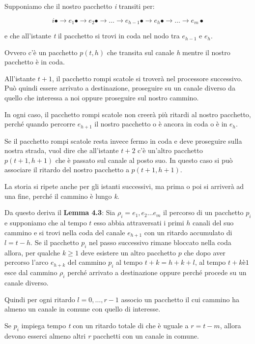 Supponiamo che il nostro pacchetto \emph{i} transiti per:

$$
i \bullet \rightarrow e_1 \bullet\rightarrow e_2\bullet \rightarrow \ldots \rightarrow e_{h-1} \bullet \rightarrow e_h \bullet \rightarrow \ldots \rightarrow e_{m}\bullet
$$

e che all'istante \emph{t} il pacchetto si trovi in coda nel nodo tra $e_{h-1}$ e $e_h$.

Ovvero c'è un pacchetto $p(t,h)$ che transita sul canale \emph{h} mentre il nostro pacchetto è in coda.

All'istante $t+1$, il pacchetto rompi scatole si troverà nel processore successivo. 
Può quindi essere arrivato a destinazione, proseguire su un canale diverso da quello che interessa a noi oppure proseguire sul nostro cammino.

In ogni caso, il pacchetto rompi scatole non creerà più ritardi al nostro pacchetto, perché quando percorre $e_{h+1}$ il nostro pacchetto o è ancora in coda o è in $e_h$. 

Se il pacchetto rompi scatole resta invece fermo in coda e deve proseguire sulla nostra strada, vuol dire che all'istante $t+2$ c'è un'altro pacchetto $p(t+1, h+1)$ che è passato sul canale al posto suo. 
In questo caso si può associare il ritardo del nostro pacchetto a $p(t+1, h+1)$.

La storia si ripete anche per gli istanti successivi, ma prima o poi si arriverà ad una fine, perché il cammino è lungo \emph{k}.

Da questo deriva il \textbf{Lemma 4.3}: Sia $\rho_i = e_1, e_2 \ldots e_m$ il percorso di un pacchetto $p_i$ e supponiamo che al tempo $t$ esso abbia attraversati i primi $h$ canali del suo cammino e si trovi nella coda del canale $e_{h+1}$ con un ritardo accumulato di $l = t-h$. Se il pacchetto $p_i$ nel passo successivo rimane bloccato nella coda allora, per qualche $k\geq 1$ deve esistere un altro pacchetto $p$ che dopo aver percorso l'arco $e_{h+k}$ del cammino $p_i$ al tempo $t+k = h+k+l$, al tempo $t+kè1$ esce dal cammino $\rho_i$ perché arrivato a destinazione oppure perché procede su un canale diverso.

Quindi per ogni ritardo $l = 0, \ldots, r-1$ associo un pacchetto il cui cammino ha almeno un canale in comune con quello di interesse.

Se $p_i$ impiega tempo \emph{t} con un ritardo totale di che è uguale a $r = t -m$, allora devono esserci almeno altri \emph{r} pacchetti con un canale in comune.

